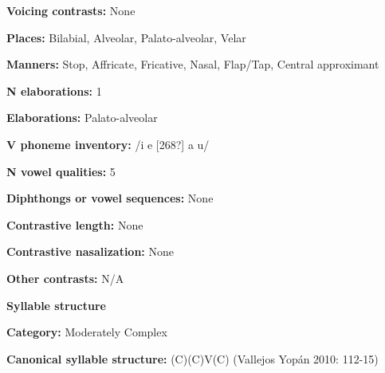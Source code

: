 \begin{styleBody}
\textbf{Voicing contrasts:} None
\end{styleBody}

\begin{styleBody}
\textbf{Places:} Bilabial, Alveolar, Palato-alveolar, Velar
\end{styleBody}

\begin{styleBody}
\textbf{Manners:} Stop, Affricate, Fricative, Nasal, Flap/Tap, Central approximant
\end{styleBody}

\begin{styleBody}
\textbf{N elaborations:} 1
\end{styleBody}

\begin{styleBody}
\textbf{Elaborations:} Palato-alveolar
\end{styleBody}

\begin{styleBody}
\textbf{V phoneme inventory:} /i e [268?] a u/
\end{styleBody}

\begin{styleBody}
\textbf{N vowel qualities:} 5
\end{styleBody}

\begin{styleBody}
\textbf{Diphthongs or vowel sequences:} None
\end{styleBody}

\begin{styleBody}
\textbf{Contrastive length:} None
\end{styleBody}

\begin{styleBody}
\textbf{Contrastive nasalization:} None
\end{styleBody}

\begin{styleBody}
\textbf{Other contrasts:} N/A
\end{styleBody}

\begin{styleBody}
\textbf{Syllable structure}
\end{styleBody}

\begin{styleBody}
\textbf{Category:} Moderately Complex
\end{styleBody}

\begin{styleBody}
\textbf{Canonical syllable structure:} (C)(C)V(C) (Vallejos Yopán 2010: 112-15)
\end{styleBody}

